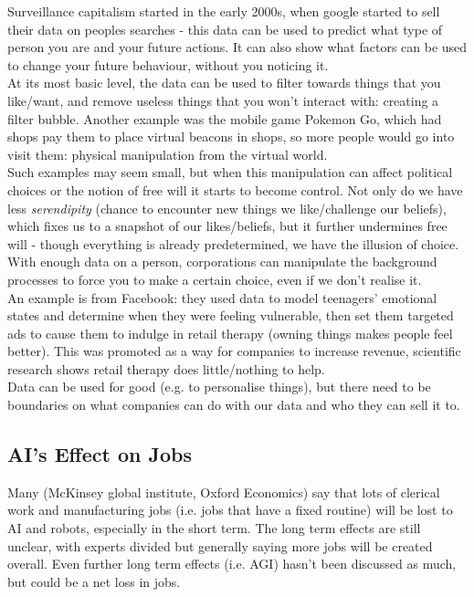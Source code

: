 Surveillance capitalism started in the early 2000s, when google started to sell their data on peoples searches - this data can be used to predict what type of person you are and your future actions. It can also show what factors can be used to change your future behaviour, without you noticing it. \\

At its most basic level, the data can be used to filter towards things that you like/want, and remove useless things that you won't interact with: creating a filter bubble. Another example was the mobile game Pokemon Go, which had shops pay them to place virtual beacons in shops, so more people would go into visit them: physical manipulation from the virtual world.\\

Such examples may seem small, but when this manipulation can affect political choices or the notion of free will it starts to become control. Not only do we have less \emph{serendipity} (chance to encounter new things we like/challenge our beliefs), which fixes us to a snapshot of our likes/beliefs, but it further undermines free will - though everything is already predetermined, we have the illusion of choice. With enough data on a person, corporations can manipulate the background processes to force you to make a certain choice, even if we don't realise it. \\

An example is from Facebook: they used data to model teenagers' emotional states and determine when they were feeling vulnerable, then set them targeted ads to cause them to indulge in retail therapy (owning things makes people feel better). This was promoted as a way for companies to increase revenue, scientific research shows retail therapy does little/nothing to help.\\

Data can be used for good (e.g. to personalise things), but there need to be boundaries on what companies can do with our data and who they can sell it to.

\subsection{AI's Effect on Jobs}
Many (McKinsey global institute, Oxford Economics) say that lots of clerical work and manufacturing jobs (i.e. jobs that have a fixed routine) will be lost to AI and robots, especially in the short term. The long term effects are still unclear, with experts divided but generally saying more jobs will be created overall. Even further long term effects (i.e. AGI) hasn't been discussed as much, but could be a net loss in jobs.

